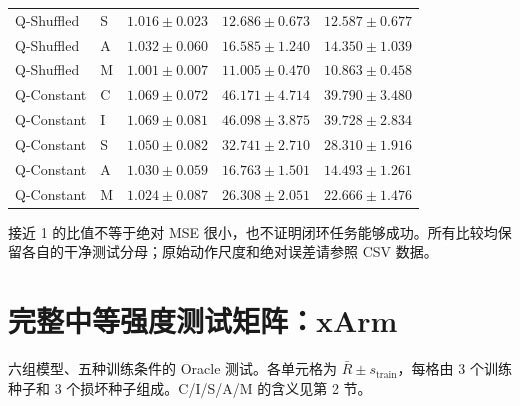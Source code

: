\documentclass[11pt,a4paper,fontset=fandol]{ctexart}
\newcommand{\note}[1]{\begin{tcolorbox}[colback=panel,colframe=rule,boxrule=0.5pt,arc=1mm]#1\end{tcolorbox}}
\begin{document}
\begin{center}
\begin{tabular}{llrrr}
Q-Shuffled & S & $1.016\pm0.023$ & $12.686\pm0.673$ & $12.587\pm0.677$ \\
Q-Shuffled & A & $1.032\pm0.060$ & $16.585\pm1.240$ & $14.350\pm1.039$ \\
Q-Shuffled & M & $1.001\pm0.007$ & $11.005\pm0.470$ & $10.863\pm0.458$ \\
Q-Constant & C & $1.069\pm0.072$ & $46.171\pm4.714$ & $39.790\pm3.480$ \\
Q-Constant & I & $1.069\pm0.081$ & $46.098\pm3.875$ & $39.728\pm2.834$ \\
Q-Constant & S & $1.050\pm0.082$ & $32.741\pm2.710$ & $28.310\pm1.916$ \\
Q-Constant & A & $1.030\pm0.059$ & $16.763\pm1.501$ & $14.493\pm1.261$ \\
Q-Constant & M & $1.024\pm0.087$ & $26.308\pm2.051$ & $22.666\pm1.476$ \\
\bottomrule
\end{tabular}
\end{center}
\note{接近 1 的比值不等于绝对 MSE 很小，也不证明闭环任务能够成功。所有比较均保留各自的干净测试分母；原始动作尺度和绝对误差请参照 CSV 数据。}
\clearpage\section{完整中等强度测试矩阵：xArm}
六组模型、五种训练条件的 Oracle 测试。各单元格为 $\bar R\pm s_{\mathrm{train}}$，每格由 3 个训练种子和 3 个损坏种子组成。C/I/S/A/M 的含义见第 2 节。
\end{document}
